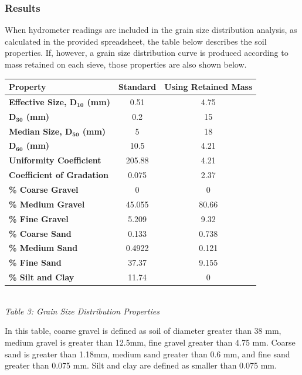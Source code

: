 \documentclass{article}
\begin{document}
\subsubsection{Results}
\par When hydrometer readings are included in the grain size distribution analysis, as calculated in the provided spreadsheet, the table below describes the soil properties. If, however, a grain size distribution curve is produced according to mass retained on each sieve, those properties are also shown below. 
\begin{center}  
    \begin{tabular}{|l|cc|} 
        \hline
        \textbf{Property} & \textbf{Standard} & \textbf{Using Retained Mass} \\
        \hline
        \textbf{Effective Size, $\bm{D_{10}}$ (mm)}           & 0.51  & 4.75     \\ 
        \hline
        \textbf{$\bm{D_{30}}$ (mm)}           & 0.2 & 15      \\ 
        \hline
        \textbf{Median Size, $\bm{D_{50}}$ (mm)}              & 5 & 18      \\ 
        \hline
        \textbf{$\bm{D_{60}}$ (mm)}           & 10.5 & 4.21      \\ 
        \hline
        \textbf{Uniformity Coefficient}   & 205.88 & 4.21      \\ 
        \hline
        \textbf{Coefficient of Gradation} & 0.075 & 2.37      \\ 
        \hline
        \textbf{\% Coarse Gravel}         & 0 & 0      \\ 
        \hline
        \textbf{\% Medium Gravel}         & 45.055 & 80.66      \\ 
        \hline
        \textbf{\% Fine Gravel}           & 5.209 & 9.32      \\ 
        \hline
        \textbf{\% Coarse Sand}           & 0.133 & 0.738      \\ 
        \hline
        \textbf{\% Medium Sand}           & 0.4922 & 0.121      \\ 
        \hline
        \textbf{\% Fine Sand}             & 37.37 & 9.155     \\ 
        \hline
        \textbf{\% Silt and Clay}         & 11.74 & 0      \\
        \hline
    \end{tabular}
    \vspace{3mm}
    \emph{\\Table 3: Grain Size Distribution Properties\\}
\end{center}
\par In this table, coarse gravel is defined as soil of diameter greater than 38 mm, medium gravel is greater than 12.5mm, fine gravel greater than 4.75 mm. Coarse sand is greater than 1.18mm, medium sand greater than 0.6 mm, and fine sand greater than 0.075 mm. Silt and clay are defined as smaller than 0.075 mm.
\end{document}
